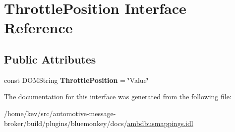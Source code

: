 \hypertarget{interfaceThrottlePosition}{\section{Throttle\+Position Interface Reference}
\label{interfaceThrottlePosition}
}
\subsection*{Public Attributes}
\begin{DoxyCompactItemize}
\item 
\hypertarget{interfaceThrottlePosition_adcfc58d73205b590b5f3371e564aa96c}{const D\+O\+M\+String {\bfseries Throttle\+Position} = \char`\"{}Value\char`\"{}}\label{interfaceThrottlePosition_adcfc58d73205b590b5f3371e564aa96c}

\end{DoxyCompactItemize}


The documentation for this interface was generated from the following file\+:\begin{DoxyCompactItemize}
\item 
/home/kev/src/automotive-\/message-\/broker/build/plugins/bluemonkey/docs/\hyperlink{ambdbusmappings_8idl}{ambdbusmappings.\+idl}\end{DoxyCompactItemize}
